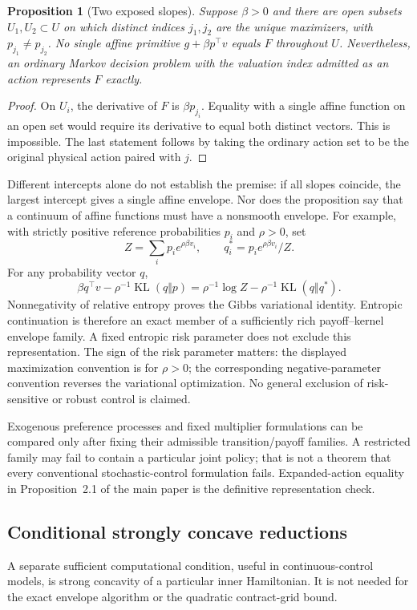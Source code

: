 \documentclass[11pt,letterpaper]{article}
\newtheorem{proposition}[theorem]{Proposition}
\theoremstyle{definition}
\newcommand{\1}{\mathbf 1}
\newcommand{\KL}{\operatorname{KL}}
\begin{document}
\begin{proposition}[Two exposed slopes]
Suppose $\beta>0$ and there are open subsets $U_1,U_2\subset U$ on which distinct indices $j_1,j_2$ are the unique maximizers, with $p_{j_1}\ne p_{j_2}$. No single affine primitive $g+\beta p^\top v$ equals $F$ throughout $U$. Nevertheless, an ordinary Markov decision problem with the valuation index admitted as an action represents $F$ exactly.
\end{proposition}
\begin{proof}
On $U_i$, the derivative of $F$ is $\beta p_{j_i}$. Equality with a single affine function on an open set would require its derivative to equal both distinct vectors. This is impossible. The last statement follows by taking the ordinary action set to be the original physical action paired with $j$.\end{proof}
Different intercepts alone do not establish the premise: if all slopes coincide, the largest intercept gives a single affine envelope. Nor does the proposition say that a continuum of affine functions must have a nonsmooth envelope. For example, with strictly positive reference probabilities $p_i$ and $\rho>0$, set
\[
 Z=\sum_i p_i e^{\rho\beta v_i},\qquad
 q_i^*=p_i e^{\rho\beta v_i}/Z.
\]
For any probability vector $q$,
\begin{equation}
 \beta q^\top v-\rho^{-1}\KL(q\Vert p)
 =\rho^{-1}\log Z-\rho^{-1}\KL(q\Vert q^*).
\end{equation}
Nonnegativity of relative entropy proves the Gibbs variational identity. Entropic continuation is therefore an exact member of a sufficiently rich payoff--kernel envelope family. A fixed entropic risk parameter does not exclude this representation. The sign of the risk parameter matters: the displayed maximization convention is for $\rho>0$; the corresponding negative-parameter convention reverses the variational optimization. No general exclusion of risk-sensitive or robust control is claimed.

Exogenous preference processes and fixed multiplier formulations can be compared only after fixing their admissible transition/payoff families. A restricted family may fail to contain a particular joint policy; that is not a theorem that every conventional stochastic-control formulation fails. Expanded-action equality in Proposition~2.1 of the main paper is the definitive representation check.

\subsection{Conditional strongly concave reductions}
A separate sufficient computational condition, useful in continuous-control models, is strong concavity of a particular inner Hamiltonian. It is not needed for the exact envelope algorithm or the quadratic contract-grid bound.
\end{document}
